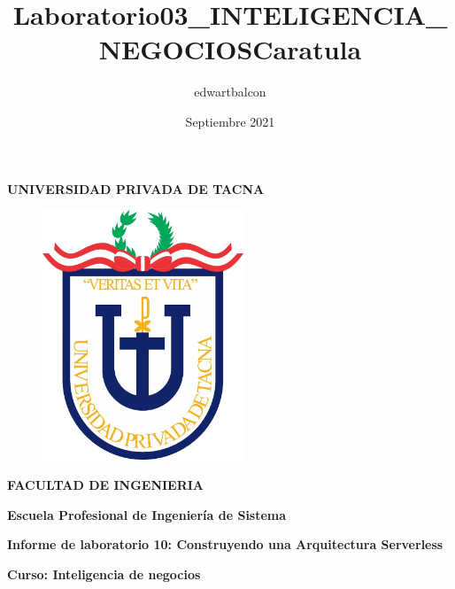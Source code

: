 \documentclass{article}
\title{Laboratorio03_INTELIGENCIA_NEGOCIOS}
\author{edwartbalcon}
\date{Septiembre 2021}
\begin{document}
\title{Caratula}

\begin{titlepage}
\begin{center}
\begin{Large}
\textbf{UNIVERSIDAD PRIVADA DE TACNA} \\
\end{Large}
\vspace*{-0.025in}
\begin{figure}[htb]
\begin{center}
\includegraphics[width=6cm]{./images/logo_UPT}
\end{center}
\end{figure}
\vspace*{-0.025in}
\begin{Large}
\textbf{FACULTAD DE INGENIERIA} \\
\end{Large}
\vspace*{0.05in}
\begin{Large}
\textbf{Escuela Profesional de Ingeniería de Sistema} \\
\end{Large}


\vspace*{0.4in}

\vspace*{0.1in}
\begin{Large}
\textbf{Informe de laboratorio 10: Construyendo una
Arquitectura Serverless} \\
\end{Large}

\vspace*{0.3in}
\begin{Large}
\textbf{Curso: Inteligencia de negocios} \\
\end{Large}


\end{center}
\end{titlepage}
\end{document}
